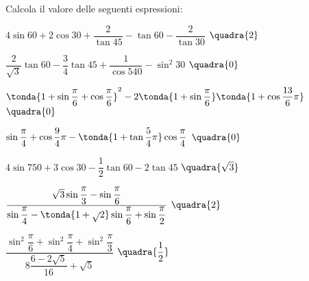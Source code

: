 \begin{esercizio}\label{ese:03.1}
Calcola il valore delle seguenti espressioni:
 \begin{enumeratea}
  \item  $4 \sin 60 + 2 \cos 30 + \dfrac{2}{\tan 45} - 
          \tan 60 - \dfrac{2}{\tan 30}$
   \hfill $\quadra{2}$
  \item  $\dfrac{2}{\sqrt{3}} \tan 60 - \dfrac{3}{4} \tan 45 + 
          \dfrac{1}{\cos 540} - \sin^2 30 $
   \hfill $\quadra{0}$
  \item  $\tonda{1 + \sin \dfrac{\pi}{6} + \cos \dfrac{\pi}{6}}^2 -
          2 \tonda{1 + \sin \dfrac{\pi}{6}} \tonda{1 + \cos \dfrac{13}{6}\pi}$
   \hfill $\quadra{0}$
  \item  $\sin \dfrac{\pi}{4} + \cos \dfrac{9}{4}\pi - 
          \tonda{1 + \tan \dfrac{5}{4}\pi} \cos \dfrac{\pi}{4}$
   \hfill $\quadra{0}$
  \item  $4 \sin 750 + 3 \cos 30 - \dfrac{1}{2} \tan 60 - 2 \tan 45$
   \hfill $\quadra{\sqrt{3}}$
  \item  $\dfrac{\sqrt{3} \sin \dfrac{\pi}{3} - \sin \dfrac{\pi}{6}}
                {\sin \dfrac{\pi}{4} - 
                 \tonda{1 + \sqrt{}2} \sin \dfrac{\pi}{6} +
                 \sin \dfrac{\pi}{2}}$
   \hfill $\quadra{2}$
  \item  $\dfrac{\sin^2 \dfrac{\pi}{6} + \sin^2 \dfrac{\pi}{4} +
                 \sin^2 \dfrac{\pi}{3}}
                {8 \dfrac{6 - 2 \sqrt{5}}{16} + \sqrt{5}}$
   \hfill $\quadra{\dfrac{1}{2}}$
 \end{enumeratea}
\end{esercizio}

\subsubsection*{}

